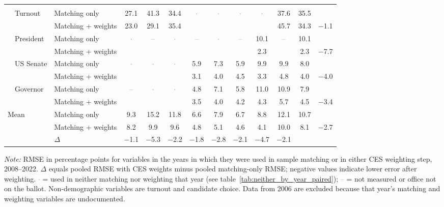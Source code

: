 \begin{table}[!htbp]
{\begin{threeparttable}
\begin{tabular}{llcccccccccc}
\addlinespace[0.3em]
\multicolumn{12}{l}{Non-demographic} \\
\addlinespace[0.1em]
~~Turnout & Matching only & 27.1 & 41.3 & 34.4 & \textcolor{gray}{$\cdot$} & \textcolor{gray}{$\cdot$} & \textcolor{gray}{$\cdot$} & \textcolor{gray}{$\cdot$} & 37.6 & 35.5 & \\
 & Matching + weights & 23.0 & 29.1 & 35.4 &  &  &  &  & 45.7 & 34.3 & $-$1.1 \\
\addlinespace[0.1em]
~~President & Matching only & \textcolor{gray}{$\cdot$} & \textcolor{gray}{--} & \textcolor{gray}{$\cdot$} & \textcolor{gray}{--} & \textcolor{gray}{$\cdot$} & \textcolor{gray}{--} & 10.1 & \textcolor{gray}{--} & 10.1 & \\
 & Matching + weights &  &  &  &  &  &  & 2.3 &  & 2.3 & $-$7.7 \\
\addlinespace[0.1em]
~~US Senate & Matching only & \textcolor{gray}{$\cdot$} & \textcolor{gray}{$\cdot$} & \textcolor{gray}{$\cdot$} & 5.9 & 7.3 & 5.9 & 9.9 & 9.9 & 8.0 & \\
 & Matching + weights &  &  &  & 3.1 & 4.0 & 4.5 & 3.3 & 4.8 & 4.0 & $-$4.0 \\
\addlinespace[0.1em]
~~Governor & Matching only & \textcolor{gray}{--} & \textcolor{gray}{$\cdot$} & \textcolor{gray}{$\cdot$} & 4.8 & 7.1 & 5.8 & 11.0 & 10.9 & 7.9 & \\
 & Matching + weights &  &  &  & 3.5 & 4.0 & 4.2 & 4.3 & 5.7 & 4.5 & $-$3.4 \\
\midrule
Mean\tnote{b} & Matching only & 9.3 & 15.2 & 11.8 & 6.6 & 7.9 & 6.7 & 8.8 & 12.1 & 10.7 & \\
 & Matching + weights & 8.2 & 9.9 & 9.6 & 4.8 & 5.1 & 4.6 & 4.1 & 10.0 & 8.1 & $-$2.7 \\
 & $\Delta$ & $-$1.1 & $-$5.3 & $-$2.2 & $-$1.8 & $-$2.8 & $-$2.1 & $-$4.7 & $-$2.1 & & \\
\bottomrule
\end{tabular}
\begin{tablenotes}
\footnotesize
\item \textit{Note:} RMSE in percentage points for variables in the years in which they were used in sample matching or in either CES weighting step, 2008--2022. $\Delta$ equals pooled RMSE with CES weights minus pooled matching-only RMSE; negative values indicate lower error after weighting. \textcolor{gray}{$\cdot$} = used in neither matching nor weighting that year (see table~\ref{tab:neither_by_year_paired}); \textcolor{gray}{--} = not measured or office not on the ballot. Non-demographic variables are turnout and candidate choice. Data from 2006 are excluded because that year's matching and weighting variables are undocumented.

\end{tablenotes}
\end{threeparttable}}
\end{table}
